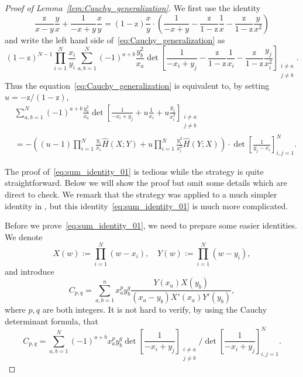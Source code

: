 \documentclass{article}
\numberwithin{equation}{section}
\newcommand{\rz}{\mathrm{z}}
\begin{document}
\begin{proof}[Proof of Lemma~\ref{lem:Cauchy_generalization}]
	We first use the identity
	\begin{equation*}
		\frac{\rz}{ x-y} \frac{y}{x}
		+\frac{1}{-x+y}\frac{x}{y} 
		=(1-\rz)\frac{x}{y}
		    \cdot\left(\frac{1}{-x+y} 
		              -\frac{\rz}{1-\rz}\frac{1}{x}
		              -\frac{\rz}{1-\rz}\frac{y}{x^2}
		         \right)
	\end{equation*}
and write the left hand side of~\eqref{eq:Cauchy_generalization} as
\begin{equation}
	(1-\rz)^{N-1}\prod_{i=1}^N\frac{x_i}{y_i} \sum_{a,b=1}^N(-1)^{a+b}\frac{y_b^2}{x_a}
	\det\left[\frac{1}{-x_i+y_j} 
	-\frac{\rz}{1-\rz}\frac{1}{x_i}
	-\frac{\rz}{1-\rz}\frac{y_j}{x_i^2}\right]_{\substack{i\ne a \\ j\ne b}}.
\end{equation}
Thus the equation~\eqref{eq:Cauchy_generalization} is equivalent to, by setting $u=-\rz/(1-\rz)$,
\begin{equation}
	\label{eq:sum_identity_01}
	\begin{split}
	&\sum_{a,b=1}^N (-1)^{a+b} \frac{y_b^2}{x_a} 
	       \det\left[  \frac{1}{-x_i+y_j} +u \frac{1}{x_i} +u \frac{y_j}{x_i^2} \right]_{\substack{i\ne a\\ j\ne b}}\\
	       &
	       = -\left(
	        (u-1)\prod_{i=1}^N \frac{y_i}{x_i} \hat H(X;Y)
	        + u \prod_{i=1}^N\frac{y_i^2}{x_i^2}\hat H(Y; X)
	       \right)\cdot \det\left[\frac{1}{y_j-x_i}\right]_{i,j=1}^N.
	       \end{split}
\end{equation}

The proof of~\eqref{eq:sum_identity_01} is tedious while the strategy is quite straightforward. Below we will show the proof but omit some details which are direct to check. We remark that the strategy was applied to a much simpler identity in \cite[Lemma 5.5]{Baik-Liu17}, but this identity~\eqref{eq:sum_identity_01} is much more complicated.

Before we prove~\eqref{eq:sum_identity_01}, we need to prepare some easier identities. We denote 
\begin{equation*}
	X(w):= \prod_{i=1}^N (w-x_i),\quad Y(w):= \prod_{i=1}^N (w-y_i),
\end{equation*}
and introduce
\begin{equation*}
	C_{p,q} = \sum_{a,b=1}^n x_a^py_b^q\frac{Y(x_a)X(y_b)}{(x_a-y_b)X'(x_a)Y'(y_b)},
\end{equation*}
where $p,q$ are both integers. It is not hard to verify, by using the Cauchy determinant formula, that
\begin{equation}
	\label{eq:C_ab_relation_Cauchy}
	C_{p,q} = \sum_{a,b=1}^N (-1)^{a+b} x_a^p y_b^q \det\left[\frac{1}{-x_i+y_j}\right]_{\substack{i\ne a\\ j\ne b}}
	/\det\left[\frac{1}{-x_i+y_j}\right]_{i,j=1}^N.
\end{equation}


\end{proof}
\end{document}
